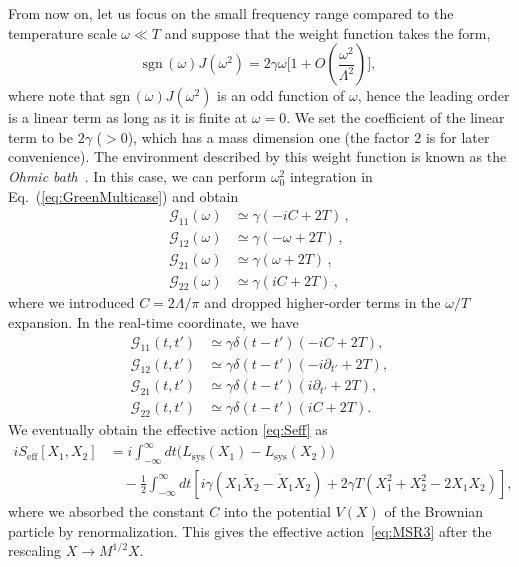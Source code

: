 \documentclass[a4paper,11pt]{article}
\begin{document}
\medskip
From now on, let us focus on the small frequency range compared to the temperature scale $\omega\ll T$ and suppose that the weight function takes the form,
\begin{equation}
\label{Ohmic}
 \mathrm{sgn}\, (\omega) J(\omega^2) 
  = 2\gamma\omega\Big[ 1 + O \left(\frac{\omega^2}{\Lambda^2}\right) \Big],
\end{equation}
where note that $ \mathrm{sgn}\, (\omega) J(\omega^2) $ is an odd function of $\omega$, hence the leading order is a linear term as long as it is finite at $\omega=0$. We set the coefficient of the linear term to be $2\gamma$ ($>0$), which has a mass dimension one (the factor $2$ is for later convenience).
The environment described by this weight function is known 
as the \textit{Ohmic bath}~\cite{kamenev2011field}.
In this case, we can perform $\omega_0^2$ integration 
in Eq.~(\ref{eq:GreenMulticase}) and obtain
\begin{equation}
 \begin{split}
\mathcal{G}_{11} (\omega)
  &\simeq \gamma(-iC
  + 2T)\,,
\\
  \mathcal{G}_{12} (\omega) 
  &\simeq \gamma(-\omega 
  + 2T)\,,
\\
  \mathcal{G}_{21} (\omega)
  &\simeq  \gamma(\omega
  + 2T)\,,
\\
  \mathcal{G}_{22} (\omega) &\simeq\gamma(iC
  + 2T)\,,
\end{split} 
\end{equation}
where we introduced $C=2\Lambda/\pi$ and dropped higher-order terms in the $\omega/T$ expansion. In the real-time coordinate, we have
\begin{equation}
 \begin{split}
\mathcal{G}_{11} (t,t') &\simeq \gamma\delta(t-t')\left(- iC 
  + 2T\right),
\\
\mathcal{G}_{12} (t,t')& \simeq \gamma\delta(t-t')\left(- i \partial_{t'}
  + 2T\right),
 \\
 \mathcal{G}_{21} (t,t') 
 &\simeq \gamma\delta(t-t')\left( i\partial_{t'}
  + 2T\right),
 \\
 \mathcal{G}_{22} (t,t') 
 &\simeq \gamma\delta(t-t')\left( iC 
  + 2T\right).
\end{split} 
\end{equation}
We eventually obtain the effective action \eqref{eq:Seff} as 
\begin{align}
\nonumber
 iS_{\mathrm{eff}}[X_1,X_2]
&
 =   i \int_{-\infty}^\infty dt \big(L_{\mathrm{sys}} (X_1) -L_{\mathrm{sys}} (X_2)\big)
 \\
&\quad  -\frac{1}{2}
  \int_{-\infty}^\infty dt 
 \left[ i\gamma\left(X_1\dot{X}_2-\dot{X}_1X_2\right) +2\gamma T\left(X_1^2+X_2^2-2X_1X_2\right)\right],
\end{align}
where we absorbed the constant $C$ into the potential $V(X)$ of the Brownian particle by renormalization.
This gives the effective action~\eqref{eq:MSR3} after the rescaling $X\to M^{1/2}X$.





{}

\end{document}
